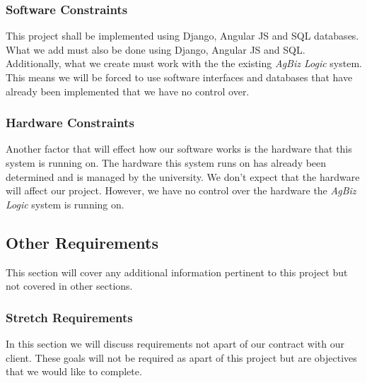 \documentclass[onecolumn, draftclsnofoot,10pt, compsoc]{article}
\begin{document}
			\subsubsection{Software Constraints}
				This project shall be implemented using Django, Angular JS and SQL databases. What we add must also be done using Django, Angular JS and SQL.\\

				Additionally, what we create must work with the the existing \textit{AgBiz Logic} system. This means we will be forced to use software interfaces and databases that have already been implemented that we have no control over.\\

			\subsubsection{Hardware Constraints}
				Another factor that will effect how our software works is the hardware that this system is running on. The hardware this system runs on has already been determined and is managed by the university. We don't expect that the hardware will affect our project. However, we have no control over the hardware the \textit{AgBiz Logic} system is running on.\\

    \subsection{Other Requirements}
				This section will cover any additional information pertinent to this project but not covered in other sections.\\
				\subsubsection{Stretch Requirements}
				In this section we will discuss requirements not apart of our contract with our client. These goals will not be required as apart of this project but are objectives that we would like to complete.\\
\end{document}
